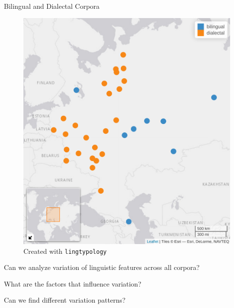 \documentclass[
  ignorenonframetext,
  t]{beamer}
\begin{document}
\begin{frame}[fragile]{Bilingual and Dialectal Corpora}
\label{bilingual-and-dialectal-corpora}
\begin{figure}[H]

{\centering \includegraphics[width=7.12in,height=0.85\textheight]{images/map.png}

}

\caption{Created with \texttt{lingtypology} \citep{moroz17}}

\end{figure}%
\end{frame}

\begin{frame}{}
\label{section}
\vfill
\centering \LARGE

\alert{Can we analyze variation of linguistic features across all corpora?}
\pause

\alert{What are the factors that influence variation?} \pause

\alert{Can we find different variation patterns?} \vfill
\end{frame}
\end{document}
